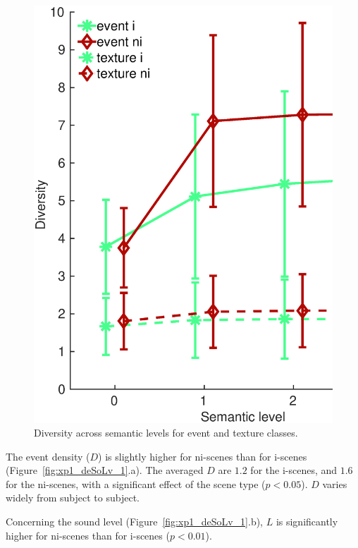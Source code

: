 \documentclass[twoside,twocolumn]{article}
\begin{document}
\begin{figure}[t!]
\centering
\includegraphics[width=\columnwidth]{../gfxMatlab/xp1_div_1.eps} 
\caption{\label{fig:analyseDensitySnrGlobal3} Diversity across semantic levels for event and texture classes. }
\end{figure}

The event density ($D$) is slightly higher for ni-scenes than for i-scenes (Figure~\ref{fig:xp1_deSoLv_1}.a). The averaged $D$ are $1.2$ for the i-scenes, and $1.6$ for the ni-scenes, with a significant effect of the scene type ($p<0.05$). $D$ varies widely from subject to subject. 

Concerning the sound level (Figure~\ref{fig:xp1_deSoLv_1}.b), $L$ is significantly higher for ni-scenes than for i-scenes ($p<0.01$). 
\end{document}
